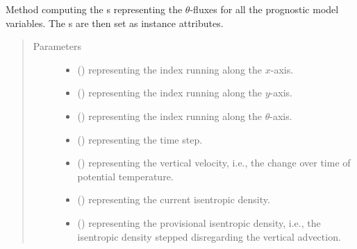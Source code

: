 \documentclass[letterpaper,10pt,english]{sphinxmanual}
\begin{document}
\begin{fulllineitems}
\begin{fulllineitems}
\label{\detokenize{api:tasmania.dycore.flux_isentropic_nonconservative_centered.FluxIsentropicNonconservativeCentered._compute_vertical_fluxes}}
Method computing the s representing the \(\theta\)-fluxes for all the
prognostic model variables. The s are then set as instance attributes.
\begin{quote}\begin{description}
\item[{Parameters}] \leavevmode\begin{itemize}
\item {} 
 () \textendash{}  representing the index running along the \(x\)-axis.

\item {} 
 () \textendash{}  representing the index running along the \(y\)-axis.

\item {} 
 () \textendash{}  representing the index running along the \(\theta\)-axis.

\item {} 
 () \textendash{}  representing the time step.

\item {} 
 () \textendash{}  representing the vertical velocity, i.e.,
the change over time of potential temperature.

\item {} 
 () \textendash{}  representing the current isentropic density.

\item {} 
 () \textendash{}  representing the provisional isentropic density, i.e.,
the isentropic density stepped disregarding the vertical advection.


\end{itemize}
\end{description}
\end{quote}
\end{fulllineitems}
\end{fulllineitems}
\end{document}
